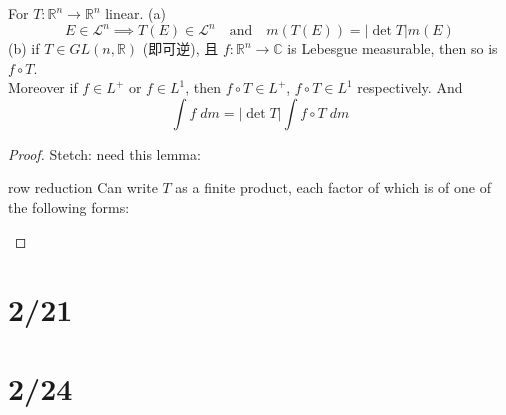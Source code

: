 \documentclass[lang=cn,11pt]{elegantbook}
\begin{document}
\begin{theorem}
For $T: \mathbb{R}^n \to \mathbb{R}^n$ linear. 
(a) \[ E \in \mathcal{L}^n  \implies T(E) \in \mathcal{L}^n  \quad \text{and}\quad    m(T(E)) = |\det T| m(E)  \]
(b) if $T \in GL(n,\mathbb{R})$ (即可逆), 且 $f: \mathbb{R}^n \to \mathbb{C}$ is Lebesgue measurable, then so is $f \circ T$.\\
Moreover if $f \in L^+$ or $f \in L^1$, then $f \circ T \in L^+$, $f \circ T \in L^1$ respectively. And \[
  \int f \; dm = |\det T| \int f \circ T \; dm
\]
\end{theorem}

\begin{proof}
    Stetch: need this lemma: \begin{lemma}{row reduction}
        Can write $T$ as a finite product, each factor of which is of one of the following forms: 
    \end{lemma}
\end{proof}





\chapter{2/21}




\chapter{2/24}
\end{document}
